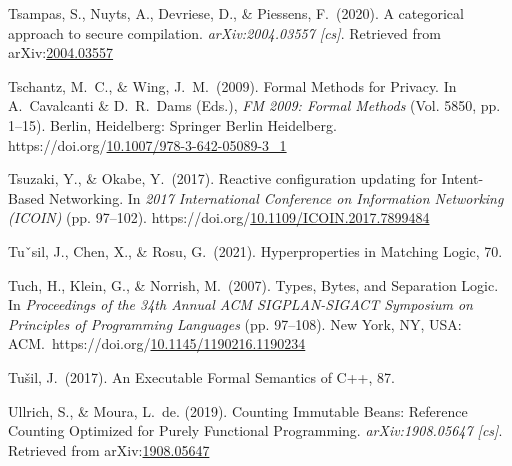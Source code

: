 \documentclass[12pt,twoside]{article}
\begin{document}
{\begin{thebibliography}{1079}
\mdbibitemlabel{}Tsampas, S., Nuyts, A., Devriese, D., \& Piessens, F.~(2020). A categorical approach to secure compilation. \emph{arXiv:2004.03557 {}[cs]}. Retrieved from arXiv:\href{http://arxiv.org/abs/2004.03557}{2004.03557}%

\mdbibitemlabel{}Tschantz, M.~C., \& Wing, J.~M.~(2009). Formal Methods for Privacy. In A.~Cavalcanti \& D.~R.~Dams (Eds.), \emph{FM 2009: Formal Methods} (Vol. 5850, pp. 1–15). Berlin, Heidelberg: Springer Berlin Heidelberg. https://doi.org/\href{https://dx.doi.org/10.1007/978-3-642-05089-3_1}{10.1007/978-3-642-05089-3\_1}%

\mdbibitemlabel{}Tsuzaki, Y., \& Okabe, Y.~(2017). Reactive configuration updating for Intent-Based Networking. In \emph{2017 International Conference on Information Networking (ICOIN)} (pp. 97–102). https://doi.org/\href{https://dx.doi.org/10.1109/ICOIN.2017.7899484}{10.1109/ICOIN.2017.7899484}%

\mdbibitemlabel{}Tuˇsil, J., Chen, X., \& Rosu, G.~(2021). Hyperproperties in Matching Logic, 70.%

\mdbibitemlabel{}Tuch, H., Klein, G., \& Norrish, M.~(2007). Types, Bytes, and Separation Logic. In \emph{Proceedings of the 34th Annual ACM SIGPLAN-SIGACT Symposium on Principles of Programming Languages} (pp. 97–108). New York, NY, USA: ACM.~https://doi.org/\href{https://dx.doi.org/10.1145/1190216.1190234}{10.1145/1190216.1190234}%

\mdbibitemlabel{}Tušil, J.~(2017). An Executable Formal Semantics of C++, 87.%

\mdbibitemlabel{}Ullrich, S., \& Moura, L.~de. (2019). Counting Immutable Beans: Reference Counting Optimized for Purely Functional Programming. \emph{arXiv:1908.05647 {}[cs]}. Retrieved from arXiv:\href{http://arxiv.org/abs/1908.05647}{1908.05647}%


\end{thebibliography}}
\end{document}

